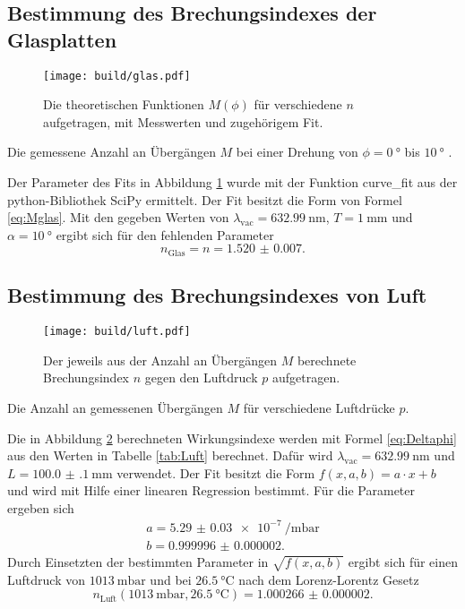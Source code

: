 \subsection{Bestimmung des Brechungsindexes der Glasplatten}
\label{ssec:glas}
\begin{figure}
	\centering
	\texttt{[image: build/glas.pdf]}
	\caption{Die theoretischen Funktionen $M(\phi)$ für verschiedene $n$ aufgetragen, mit Messwerten und zugehörigem Fit.}
	\label{fig:Glas}
\end{figure}
\begin{table}
	\centering
	\caption{Die gemessene Anzahl an Übergängen $M$ bei einer Drehung von $\phi=\SI{0}{\degree}$ bis $\SI{10}{\degree}$ .}
	
\end{table}
Der Parameter des Fits in Abbildung \ref{fig:Glas} wurde mit der Funktion curve\_fit aus der python-Bibliothek SciPy \cite{scipy} ermittelt. Der Fit besitzt die Form von Formel \eqref{eq:Mglas}. Mit den gegeben Werten von $\lambda_\text{vac}=\SI{632.99}{\nano\meter}$, $T=\SI{1}{\milli\meter}$ und $\alpha=\SI{10}{\degree}$ ergibt sich für den fehlenden Parameter
\begin{displaymath}
	n_\text{Glas}=n=\num{1.520(7)}.
\end{displaymath}

\subsection{Bestimmung des Brechungsindexes von Luft}
\label{ssec:luft}
\begin{figure}
	\centering
	\texttt{[image: build/luft.pdf]}
	\caption{Der jeweils aus der Anzahl an Übergängen $M$ berechnete Brechungsindex $n$ gegen den Luftdruck $p$ aufgetragen.}
	\label{fig:Luft}
\end{figure}
\begin{table}
	\centering
	\caption{Die Anzahl an gemessenen Übergängen $M$ für verschiedene Luftdrücke $p$.}
	
\end{table}
Die in Abbildung \ref{fig:Luft} berechneten Wirkungsindexe werden mit Formel \eqref{eq:Deltaphi} aus den Werten in Tabelle \ref{tab:Luft} berechnet. Dafür wird $\lambda_\text{vac}=\SI{632.99}{\nano\meter}$ und $L=\SI{100.0(1)}{\milli\meter}$ verwendet. Der Fit besitzt die Form $f(x,a,b) =a\cdot x +b$ und wird mit Hilfe einer linearen Regression bestimmt. Für die Parameter ergeben sich
\begin{gather*}
	a=\SI{5.29(3)e-7}{\per\milli\bar}\\
	b=\num{0.999996(2)}.
\end{gather*}
Durch Einsetzten der bestimmten Parameter in $\sqrt{f(x,a,b)}$ ergibt sich für einen Luftdruck von $\SI{1013}{\milli\bar}$ und bei $\SI{26.5}{\degreeCelsius}$ nach dem Lorenz-Lorentz Gesetz
\begin{displaymath}
 n_\text{Luft}(\SI{1013}{\milli\bar},\SI{26.5}{\degreeCelsius})=\num{1.000266(2)}.
\end{displaymath}
